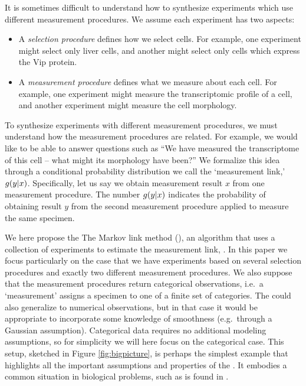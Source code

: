 It is sometimes difficult to understand how to synthesize experiments which use different measurement procedures.  We assume each experiment has two aspects:
%
\begin{itemize}
    \item A \emph{selection procedure} defines how we select cells.  For example, one experiment might select only liver cells, and another might select only cells which express the Vip protein.  
    \item A \emph{measurement procedure} defines what we measure about each cell.  For example, one experiment might measure the transcriptomic profile of a cell, and another experiment might measure the cell morphology.
\end{itemize}
%
To synthesize experiments with different measurement procedures, we must understand how the measurement procedures are related.  For example, we would like to be able to answer questions such as ``We have measured the transcriptome of this cell -- what might its morphology have been?''  We formalize this idea through a conditional probability distribution we call the `measurement link,' $g(y|x)$.  Specifically, let us say we obtain measurement result $x$ from one measurement procedure.  The number $g(y|x)$ indicates the probability of obtaining result $y$ from the second measurement procedure applied to measure the same specimen.  

We here propose the The Markov link method (\MLM), an algorithm that uses a collection of experiments to estimate the measurement link, \pxy.  In this paper we focus particularly on the case that we have experiments based on several selection procedures and exactly two different measurement procedures.  We also suppose that the measurement procedures return categorical observations, i.e.\ a `measurement' assigns a specimen to one of a finite set of categories.  The \MLM{} could also generalize to numerical observations, but in that case it would be appropriate to incorporate some knowledge of smoothness (e.g.\ through a Gaussian assumption).  Categorical data requires no additional modeling assumptions, so for simplicity we will here focus on the categorical case.  This setup, sketched in Figure \ref{fig:bigpicture}, is perhaps the simplest example that highlights all the important assumptions and properties of the \MLM.  It embodies a common situation in biological problems, such as is found in \cite{gouwens2018classification}. 

